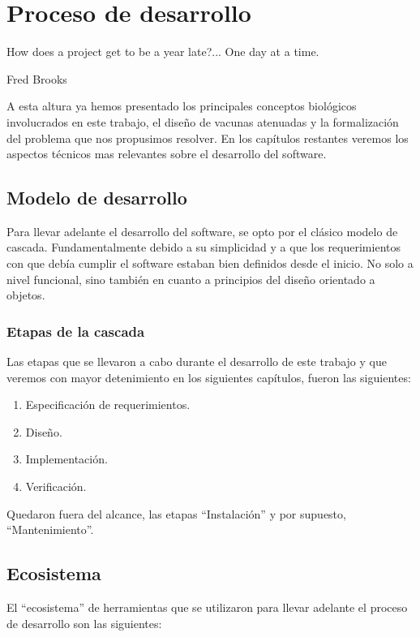 \chapter{Proceso de desarrollo}
\epigraph{How does a project get to be a year late?... One day at a time.}%
{Fred Brooks}

A esta altura ya hemos presentado los principales conceptos biol\'ogicos
involucrados en este trabajo, el dise\~no de vacunas atenuadas y la
formalizaci\'on del problema que nos propusimos resolver. En los cap\'itulos
restantes veremos los aspectos t\'ecnicos mas relevantes sobre el desarrollo del
software.

\section{Modelo de desarrollo}

Para llevar adelante el desarrollo del software, se opto por el cl\'asico
modelo de cascada. Fundamentalmente debido a su simplicidad y a que los
requerimientos con que deb\'ia cumplir el software estaban bien definidos desde
el inicio. No solo a nivel funcional, sino tambi\'en en cuanto a principios del
dise\~no orientado a objetos.

\subsection{Etapas de la cascada}

Las etapas que se llevaron a cabo durante el desarrollo de este trabajo y que
veremos con mayor detenimiento en los siguientes cap\'itulos, fueron las
siguientes:
\begin{enumerate}
 \item Especificaci\'on de requerimientos.
 \item Dise\~no.
 \item Implementaci\'on.
 \item Verificaci\'on.
\end{enumerate}

Quedaron fuera del alcance, las etapas ``Instalaci\'on'' y por supuesto,
``Mantenimiento''.

\section{Ecosistema}

El ``ecosistema'' de herramientas que se utilizaron para llevar adelante el
proceso de desarrollo son las siguientes:

